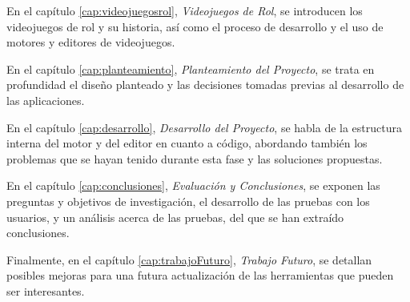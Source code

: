 \medskip

En el capítulo \ref{cap:videojuegosrol}, \textit{Videojuegos de Rol}, se introducen los videojuegos de rol y su historia, así como el proceso de desarrollo y el uso de motores y editores de videojuegos.

\medskip

En el capítulo \ref{cap:planteamiento}, \textit{Planteamiento del Proyecto}, se trata en profundidad el diseño planteado y las decisiones tomadas previas al desarrollo de las aplicaciones.

\medskip

En el capítulo \ref{cap:desarrollo}, \textit{Desarrollo del Proyecto}, se habla de la estructura interna del motor y del editor en cuanto a código, abordando también los problemas que se hayan tenido durante esta fase y las soluciones propuestas.

\medskip

En el capítulo \ref{cap:conclusiones}, \textit{Evaluación y Conclusiones}, se exponen las preguntas y objetivos de investigación, el desarrollo de las pruebas con los usuarios, y un análisis acerca de las pruebas, del que se han extraído conclusiones.

\medskip

Finalmente, en el capítulo \ref{cap:trabajoFuturo}, \textit{Trabajo Futuro}, se detallan posibles mejoras para una futura actualización de las herramientas que pueden ser interesantes.